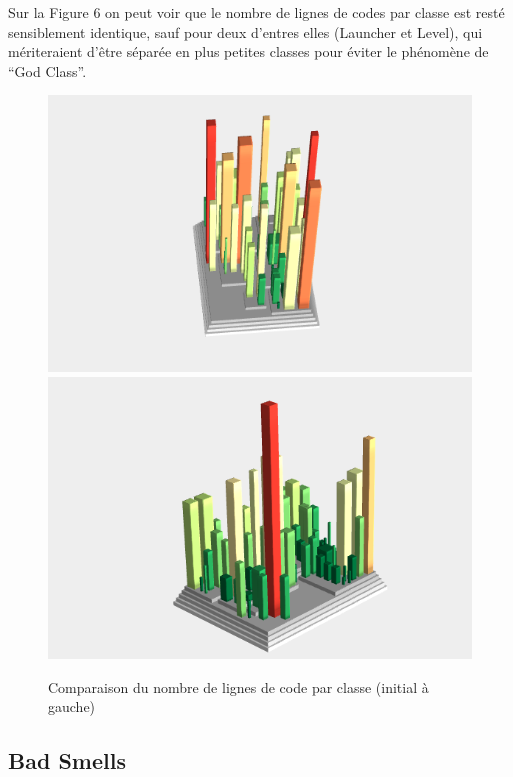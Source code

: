 \documentclass[a4paper,12pt]{report} %
\begin{document}
Sur la Figure 6 on peut voir que le nombre de lignes de codes par
classe est resté sensiblement identique, sauf pour deux d'entres elles
(Launcher et Level), qui mériteraient d'être séparée en plus petites
classes pour éviter le phénomène de ``God Class''.

\begin{figure}[!h]
\includegraphics[scale=0.5]{ressources/final_initial_lines_of_code}\includegraphics[scale=0.5]{ressources/final_new_lines_of_code}\caption{Comparaison du nombre de lignes de code par classe (initial à gauche)}


\end{figure}



\subsection{Bad Smells}
\end{document}
